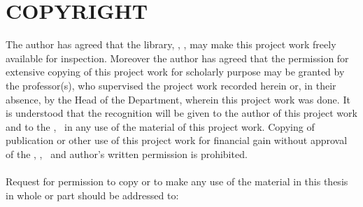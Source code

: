 \section*{COPYRIGHT}
\vspace{0.5cm}

The author has agreed that the library, \thedepartment, \thecampus, may make this project
work freely available for inspection. Moreover the author has agreed that the
permission for extensive copying of this project work for scholarly purpose may be
granted by the professor(s), who supervised the project work recorded herein or, in
their absence, by the Head of the Department, wherein this project work was done. It
is understood that the recognition will be given to the author of this project work and
to the \thedepartment, \thecampus \ in any use of the material of this project work. Copying of publication or other use of
this project work for financial gain without approval of the \thedepartment, \theinstitute, \thecampus \ and author’s
written permission is prohibited.\\
\\
Request for permission to copy or to make any use of the material in this thesis in
whole or part should be addressed to:\\
\\
\thedepartment\\
\thecampus\\
\thedepartmentFullAddress

